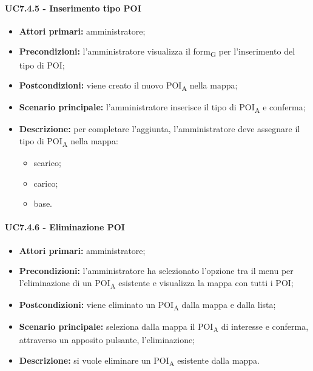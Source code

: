 \paragraph{UC7.4.5 - Inserimento tipo POI}
\begin{itemize}
	\item 	\textbf{Attori primari:} amministratore;
	\item 	\textbf{Precondizioni:} l'amministratore visualizza il \gls{form}\textsubscript{G} per l'inserimento del tipo di POI;
	\item 	\textbf{Postcondizioni:} viene creato il nuovo \acrshort{POI}\textsubscript{A} nella mappa; 
	\item 	\textbf{Scenario principale:} l'amministratore inserisce il tipo di \acrshort{POI}\textsubscript{A} e conferma;
	\item 	\textbf{Descrizione:} per completare l'aggiunta, l'amministratore deve assegnare il tipo di \acrshort{POI}\textsubscript{A} nella mappa:
	\begin{itemize}
		\item scarico;
		\item carico;
		\item base.
	\end{itemize}

\end{itemize}

\paragraph{UC7.4.6 - Eliminazione POI}
\begin{itemize}
	\item 	\textbf{Attori primari:} amministratore;
	\item 	\textbf{Precondizioni:} l'amministratore ha selezionato l'opzione tra il menu per l'eliminazione di un \acrshort{POI}\textsubscript{A} esistente e visualizza la mappa con tutti i POI;
	\item 	\textbf{Postcondizioni:} viene eliminato un \acrshort{POI}\textsubscript{A} dalla mappa e dalla lista; 
	\item 	\textbf{Scenario principale:} seleziona dalla mappa il \acrshort{POI}\textsubscript{A} di interesse e conferma, attraverso un apposito pulsante, l'eliminazione;
	\item 	\textbf{Descrizione:} si vuole eliminare un \acrshort{POI}\textsubscript{A} esistente dalla mappa.
\end{itemize}
